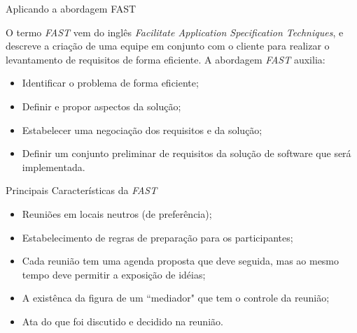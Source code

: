 \documentclass[xcolor=x11names,compress]{beamer}
\begin{document}
\begin{frame}{Aplicando a abordagem FAST}

O termo \textit{FAST} vem do inglês \textit{Facilitate Application Specification Techniques}, e descreve a criação de uma equipe em conjunto com o cliente para realizar o levantamento de requisitos de forma eficiente. A abordagem \textit{FAST} auxilia:

\begin{itemize}

\item Identificar o problema de forma eficiente;

\item Definir e propor aspectos da solução;

\item Estabelecer uma negociação dos requisitos e da solução;

\item Definir um conjunto preliminar de requisitos da solução de software que será implementada.

\end{itemize}

\end{frame}

\begin{frame}{Principais Características da \textit{FAST}}

\begin{itemize}
\itemsep 5mm

\item Reuniões em locais neutros (de preferência);

\item Estabelecimento de regras de preparação para os participantes;

\item Cada reunião tem uma agenda proposta que deve seguida, mas ao mesmo tempo deve permitir a exposição de idéias;

\item A existênca da figura de um ``mediador" que tem o controle da reunião;

\item Ata do que foi discutido e decidido na reunião.

\end{itemize}

\end{frame}
\end{document}
